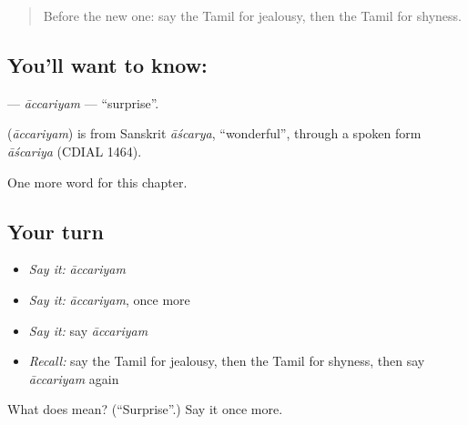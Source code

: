 \label{lesson:TA-C210-accariyam}



\begin{quote}
Before the new one: say the Tamil for jealousy, then the Tamil for shyness.
\end{quote}

\subsection*{You'll want to know: }
\textbf{} — \emph{āccariyam} — \textquotedblleft{}surprise\textquotedblright{}.

\begin{cousinweb}
\textbf{} (\emph{āccariyam}) is from Sanskrit \emph{āścarya}, \textquotedblleft{}wonderful\textquotedblright{}, through a spoken form \emph{āścariya} (CDIAL 1464).
\end{cousinweb}

\begin{grammarlens}[title={What you've built}]
One more word for this chapter.
\end{grammarlens}

\subsection*{Your turn}
\begin{itemize}
\raggedright
  \item \emph{Say it:} \emph{āccariyam}
  \item \emph{Say it:} \emph{āccariyam}, once more
  \item \emph{Say it:} say \emph{āccariyam}
  \item \emph{Recall:} say the Tamil for jealousy, then the Tamil for shyness, then say \emph{āccariyam} again
\end{itemize}

\begin{tcolorbox}[breakable,colback=teal!4,colframe=teal!35!black,title={Before you move on}]
What does  mean? (\textquotedblleft{}Surprise\textquotedblright{}.) Say it once more.
\end{tcolorbox}
